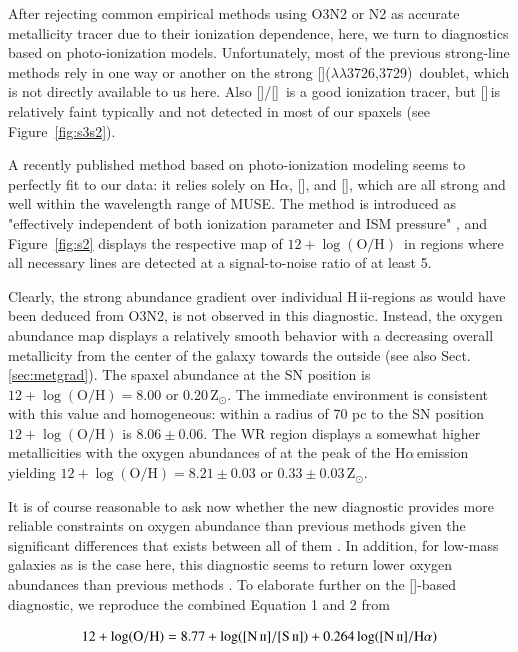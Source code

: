 \documentclass[traditabstract]{aa}
\newcommand{\ha}{H$\alpha$}
\newcommand{\hii}{\mbox{H\,{\sc ii}}}
\newcommand{\oh}{12+\log(\mathrm{O/H})}
\newcommand{\sii}{[\ion{S}{ii}]}
\newcommand{\siii}{[\ion{S}{iii}]}
\newcommand{\oii}{[\ion{O}{ii}]}
\newcommand{\nii}{[\ion{N}{ii}]}
\begin{document}
After rejecting common empirical methods using O3N2 or N2 as accurate metallicity tracer due to their ionization dependence, here, we turn to diagnostics based on photo-ionization models. Unfortunately, most of the previous strong-line methods rely in one way or another on the strong \oii($\lambda\lambda$3726,3729)\, doublet\citep{2002ApJS..142...35K}, which is not directly available to us here. Also \siii/\sii\, is a good ionization tracer, but \siii\,is relatively faint typically and not detected in most of our spaxels (see Figure~\ref{fig:s3s2}). 

A recently published method based on photo-ionization modeling \citep{2016Ap&SS.361...61D} seems to perfectly fit to our data: it relies solely on \ha, \nii, and \sii, which are all strong and well within the wavelength range of MUSE. The method is introduced as "effectively independent of both ionization parameter and ISM pressure" \citep{2016Ap&SS.361...61D}, and Figure~\ref{fig:s2} displays the respective map of $\oh$\, in regions where all necessary lines are detected at a signal-to-noise ratio of at least 5.

Clearly, the strong abundance gradient over individual \hii-regions as would have been deduced from O3N2, is not observed in this diagnostic. Instead, the oxygen abundance map displays a relatively smooth behavior with a decreasing overall metallicity from the center of the galaxy towards the outside (see also Sect. \ref{sec:metgrad}). The spaxel abundance at the SN position is $\oh=8.00$ or 0.20\,Z$_{\odot}$. The immediate environment is consistent with this value and homogeneous: within a radius of 70 pc to the SN position $\oh$ is $8.06\pm 0.06$. The WR region displays a somewhat higher metallicities with the oxygen abundances of at the peak of the \ha\,emission yielding $\oh=8.21\pm 0.03$ or $0.33\pm0.03\,$Z$_{\odot}$.

It is of course reasonable to ask now whether the new \citet{2016Ap&SS.361...61D} diagnostic provides more reliable constraints on oxygen abundance than previous methods given the significant differences that exists between all of them \citep{2016arXiv161108595B}. In addition, for low-mass galaxies as is the case here, this diagnostic seems to return lower oxygen abundances than previous methods \citep{2016ApJ...823L..24K}. To elaborate further on the \sii-based diagnostic, we reproduce the combined Equation 1 and 2 from \citet{2016Ap&SS.361...61D}

\begin{equation}
12+\log(\mathrm{O/H}) = 8.77 + \log([\ion{N}{ii}]/[\ion{S}{ii}]) + 0.264\log([\ion{N}{ii}]/\mathrm{H}\alpha)
\end{equation}
\end{document}
